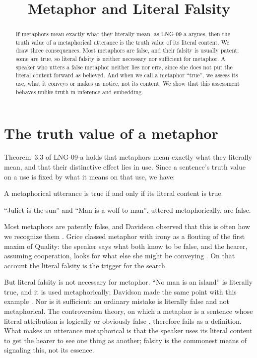 \documentclass{situationist-preprint}
\title{Metaphor and Literal Falsity}
\begin{document}
\maketitle

\begin{abstract}
If metaphors mean exactly what they literally mean, as LNG-09-a argues, then the truth value of a metaphorical utterance is the truth value of its literal content. We draw three consequences. Most metaphors are false, and their falsity is usually patent; some are true, so literal falsity is neither necessary nor sufficient for metaphor. A speaker who utters a false metaphor neither lies nor errs, since she does not put the literal content forward as believed. And when we call a metaphor \enquote{true}, we assess its use, what it conveys or makes us notice, not its content. We show that this assessment behaves unlike truth in inference and embedding.
\end{abstract}

\section{The truth value of a metaphor}

Theorem~3.3 of LNG-09-a holds that metaphors mean exactly what they literally mean, and that their distinctive effect lies in use. Since a sentence's truth value on a use is fixed by what it means on that use, we have:

\begin{proposition}\label{p:tv}
A metaphorical utterance is true if and only if its literal content is true.
\end{proposition}

\begin{corollary}\label{c:false}
\enquote{Juliet is the sun} and \enquote{Man is a wolf to man}, uttered metaphorically, are false.
\end{corollary}

Most metaphors are patently false, and Davidson observed that this is often how we recognize them \citep{Davidson1978}. Grice classed metaphor with irony as a flouting of the first maxim of Quality: the speaker says what both know to be false, and the hearer, assuming cooperation, looks for what else she might be conveying \citep{Grice1975}. On that account the literal falsity is the trigger for the search.

But literal falsity is not necessary for metaphor. \enquote{No man is an island} is literally true, and it is used metaphorically; Davidson made the same point with this example \citep{Davidson1978}. Nor is it sufficient: an ordinary mistake is literally false and not metaphorical. The controversion theory, on which a metaphor is a sentence whose literal attribution is logically or obviously false \citep{Beardsley1962}, therefore fails as a definition. What makes an utterance metaphorical is that the speaker uses its literal content to get the hearer to see one thing as another; falsity is the commonest means of signaling this, not its essence.
\end{document}
